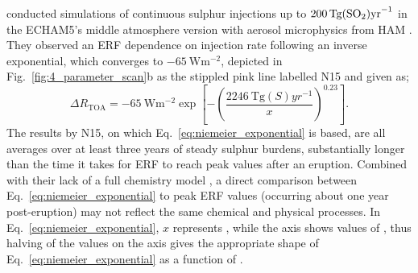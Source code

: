 \documentclass[draft]{agujournal2019}
\begin{document}
   conducted simulations of continuous sulphur injections up to
  \(\SI{200}{\tera\gram(\ce{SO2})\mathrm{yr}^{-1}}\) in the ECHAM5's middle atmosphere
  version \cite{giorgetta2006} with aerosol microphysics from HAM \cite{stier2005}. They
  observed an ERF dependence on  injection rate following an inverse
  exponential, which converges to \(\SI{-65}{\watt\meter^{-2}}\), depicted in
  Fig.~\ref{fig:4_parameter_scan}b as the stippled pink line labelled N15 and given as;
  \begin{equation}
    \Delta R_{\mathrm{TOA}} = -\SI{65}{\watt\metre^{-2}}
    \exp\left[-{\left(\frac{\SI{2246}{\tera\gram(S)yr^{-1}}}{x}\right)}^{0.23}\right].
    \label{eq:niemeier_exponential}
  \end{equation}
  The results by N15, on which Eq.~\ref{eq:niemeier_exponential} is based, are all
  averages over at least three years of steady sulphur burdens, substantially longer
  than the time it takes for ERF to reach peak values after an eruption. Combined with
  their lack of a full chemistry model \cite{niemeier2015}, a direct comparison between
  Eq.~\ref{eq:niemeier_exponential} to peak ERF values (occurring about one year
  post-eruption) may not reflect the same chemical and physical processes. In
  Eq.~\ref{eq:niemeier_exponential}, \(x\) represents , while the axis shows
  values of , thus halving of the  values on the axis gives the
  appropriate shape of Eq.~\ref{eq:niemeier_exponential} as a function of .
\end{document}
